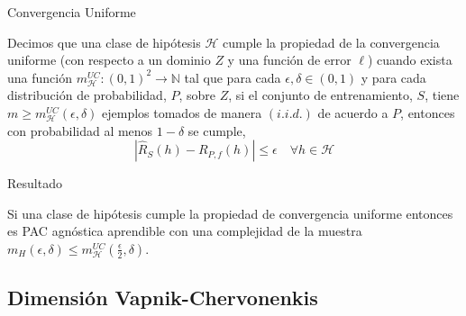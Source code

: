 \begin{frame}{Convergencia Uniforme}
    
    \begin{definition}
       Decimos que una clase de hipótesis $\mathcal{H}$ cumple la propiedad de la convergencia uniforme (con respecto a un dominio $Z$ y una función de error $\ell$) cuando exista una función $m_{\mathcal{H}}^{UC}:(0,1)^2 \to \mathbb{N}$ tal que para cada $\epsilon, \delta \in (0,1)$ y para cada distribución de probabilidad, $P$, sobre $Z$, si el conjunto de entrenamiento, $S$, tiene $m \geq m_{\mathcal{H}}^{UC}(\epsilon,\delta)$ ejemplos tomados de manera $(i.i.d.)$ de acuerdo a $P$, entonces con probabilidad al menos $1-\delta$ se cumple,
           \begin{equation}
            |\hat{R}_{S}(h) - R_{P,f}(h)| \leq \epsilon \quad \forall h \in \mathcal{H}
           \end{equation}
    \end{definition}
    
\end{frame}



\begin{frame}{Resultado}
    \begin{proposition}
        Si una clase de hipótesis cumple la propiedad de convergencia uniforme entonces es PAC agnóstica aprendible con una complejidad de la muestra ${m_{H}(\epsilon,\delta) \leq m_{\mathcal{H}}^{UC}(\frac{\epsilon}{2},\delta)}$.
    \end{proposition}
    
\end{frame} 




\subsection{Dimensión Vapnik-Chervonenkis}

